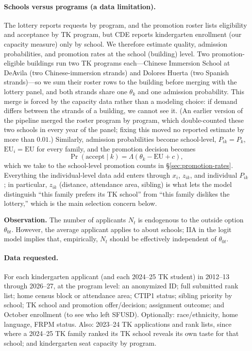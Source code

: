 \documentclass{article}
\begin{document}
\paragraph{Schools versus programs (a data limitation).} The lottery reports requests by program, and the promotion roster lists eligibility and acceptance by TK program, but CDE reports kindergarten enrollment (our capacity measure) only by school. We therefore estimate quality, admission probabilities, and promotion rates at the school (building) level. Two promotion-eligible buildings run two TK programs each---Chinese Immersion School at DeAvila (two Chinese-immersion strands) and Dolores Huerta (two Spanish strands)---so we sum their roster rows to the building before merging with the lottery panel, and both strands share one $\theta_k$ and one admission probability. This merge is forced by the capacity data rather than a modeling choice: if demand differs between the strands of a building, we cannot see it. (An earlier version of the pipeline merged the roster program by program, which double-counted these two schools in every year of the panel; fixing this moved no reported estimate by more than $0.01$.) Similarly, admission probabilities become school-level, $P_{ik} = P_k$, $\mathrm{EU}_i = \mathrm{EU}$ for every family, and the promotion decision becomes
\[
\Pr\left( \text{accept} \mid k \right) = \Lambda\left( \theta_k - \mathrm{EU} + c \right),
\]
which we take to the school-level promotion counts in \S\ref{sec:promotion-rates}. Everything the individual-level data add enters through $x_i$, $z_{ik}$, and individual $P_{ik}$; in particular, $z_{ik}$ (distance, attendance area, sibling) is what lets the model distinguish ``this family prefers its TK school'' from ``this family dislikes the lottery,'' which is the main selection concern below.

\textbf{Observation.} The number of applicants $N_t$ is endogenous to the outside option $\theta_{0t}$. However, the average applicant applies to about \numReqPerApplicant{} schools; IIA in the logit model implies that, empirically, $N_t$ should be effectively independent of $\theta_{0t}$.

\paragraph{Data requested.} For each kindergarten applicant (and each 2024--25 TK student) in 2012--13 through 2026--27, at the program level: an anonymized ID; full submitted rank list; home census block or attendance area; CTIP1 status; sibling priority by school; TK school and promotion offer/decision; assignment outcome; and October enrollment (to see who left SFUSD). Optionally: race/ethnicity, home language, FRPM status. Also: 2023--24 TK applications and rank lists, since where a 2024--25 TK family ranked its TK school reveals its own taste for that school; and kindergarten seat capacity by program.
\end{document}

